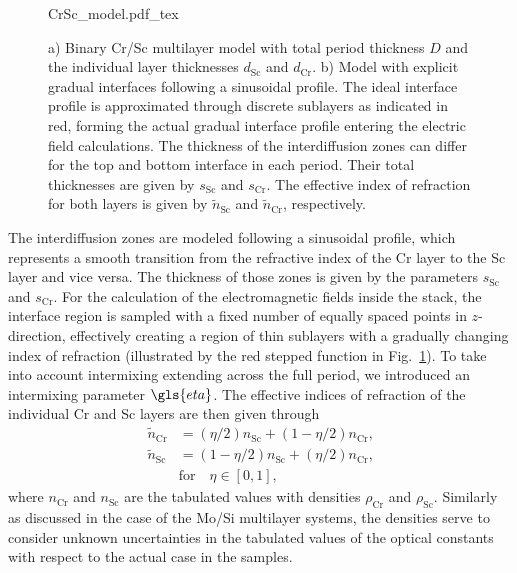 \begin{figure}[htb]
    \def\svgwidth{\textwidth}
    {CrSc_model.pdf_tex}
    \caption[Binary and gradual Cr/Sc multilayer models.]{a) Binary Cr/Sc multilayer model with total period thickness $D$ and 
the individual layer thicknesses $d_\text{Sc}$ and $d_\text{Cr}$. b) Model with 
explicit gradual interfaces following a sinusoidal profile. The ideal interface 
profile is approximated through discrete sublayers as indicated in red, forming 
the actual gradual interface profile entering the electric field calculations. 
The thickness of the interdiffusion zones can differ for the top and bottom 
interface in each period. Their total thicknesses are given by $s_\text{Sc}$ 
and $s_\text{Cr}$. The effective index of refraction for both layers is given 
by $\tilde{n}_\text{Sc}$ and $\tilde{n}_\text{Cr}$, respectively.}
    \label{ch_spec:fig_CrScModel}
\end{figure}
The interdiffusion zones are modeled following a sinusoidal profile, which represents a smooth transition from the refractive index of the Cr layer to the Sc layer and vice versa. The thickness of those zones is given by the parameters $s_\text{Sc}$ and $s_\text{Cr}$. For the calculation of the electromagnetic fields inside the stack, the interface region is sampled with a fixed number of equally spaced points in $z$-direction, effectively creating a region of thin sublayers with a gradually changing index of refraction (illustrated by the red stepped function in Fig.~\ref{ch_spec:fig_CrScModel}). To take into account intermixing extending across the full period, we introduced an intermixing parameter $\gls{eta}$. The effective indices of refraction of the individual Cr and Sc layers are then given through
\begin{align}
\tilde{n}_\text{Cr} &=(\eta/2) n_\text{Sc} + (1-\eta/2) n_\text{Cr} \text{,} 
\nonumber\\
\tilde{n}_\text{Sc} &=(1-\eta/2) n_\text{Sc} + (\eta/2) n_\text{Cr} \text{,} 
\label{eqn:effective_n} \\
&\text{for} \quad \eta \in [0,1] \text{,}\nonumber
\end{align}
where $n_\text{Cr}$ and $n_\text{Sc}$ are the tabulated values \cite{henke_x-ray_1993} 
with densities $\rho_\text{Cr}$ and $\rho_\text{Sc}$. Similarly as discussed in the case of the Mo/Si multilayer systems, the densities serve to consider unknown uncertainties in the tabulated values of the optical constants with respect to the actual case in the samples.

